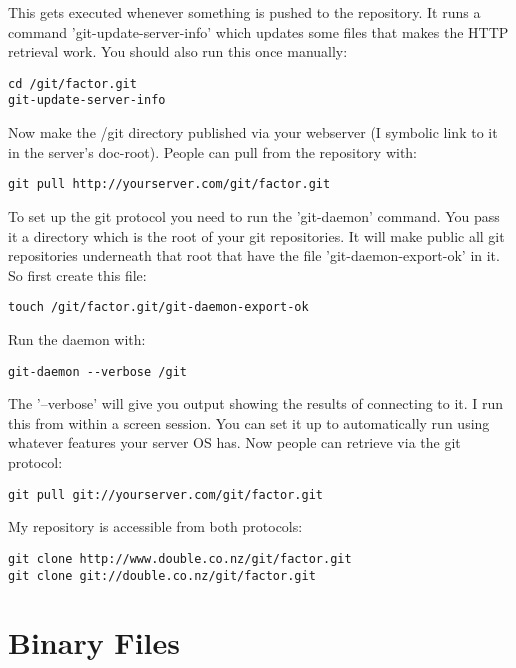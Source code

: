 This gets executed whenever something is pushed to the repository. It
runs a command 'git-update-server-info' which updates some files that
makes the HTTP retrieval work. You should also run this once manually:

\begin{verbatim}
cd /git/factor.git
git-update-server-info
\end{verbatim}

Now make the /git directory published via your webserver (I symbolic
link to it in the server's doc-root). People can pull from the
repository with:

\begin{verbatim}
git pull http://yourserver.com/git/factor.git
\end{verbatim}

To set up the git protocol you need to run the 'git-daemon'
command. You pass it a directory which is the root of your git
repositories. It will make public all git repositories underneath that
root that have the file 'git-daemon-export-ok' in it. So first create
this file:

\begin{verbatim}
touch /git/factor.git/git-daemon-export-ok
\end{verbatim}

Run the daemon with:

\begin{verbatim}
git-daemon --verbose /git
\end{verbatim}

The '--verbose' will give you output showing the results of connecting
to it. I run this from within a screen session. You can set it up to
automatically run using whatever features your server OS has. Now
people can retrieve via the git protocol:

\begin{verbatim}
git pull git://yourserver.com/git/factor.git
\end{verbatim}

My repository is accessible from both protocols:

\begin{verbatim}
git clone http://www.double.co.nz/git/factor.git
git clone git://double.co.nz/git/factor.git
\end{verbatim}

\section{Binary Files}

